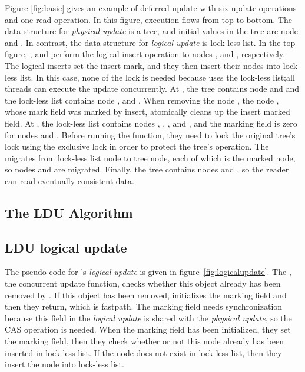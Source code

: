 Figure \ref{fig:basic} gives an example of deferred update with six update
operations and one read operation.
In this figure, execution flows from top to bottom.
The data structure for \emph{physical update} is a tree, and initial values in
the tree are node  and .
In contrast, the data structure for \emph{logical update} is lock-less list.
In the top figure, ,  and  perform the
logical insert operation to nodes ,  and ,
 respectively.
The logical inserts set the insert mark, and they then insert their
nodes into lock-less list.
In this case, none of the lock is needed because  uses the lock-less
list;all threads can execute the update concurrently.
At , the tree contains node 
and  and 
the lock-less list contains node ,  and .
When removing the node , the node , whose mark field was marked
by insert, atomically cleans up the insert marked field.
At , the lock-less list contains nodes
, , , and , and the marking field is zero for 
nodes  and .
Before running the  function, they need to lock the original
 tree's lock using the exclusive lock in order to protect the tree's
 operation.
The  migrates from lock-less list node to tree node, each of 
which is the marked node, so nodes  and  are migrated.
Finally, the tree contains nodes  and , so the reader can read
 eventually consistent data.


\subsection{The LDU Algorithm}



\subsection{LDU logical update}

The pseudo code for 's \emph{logical update} is given in
figure~\ref{fig:logicalupdate}.
The , the concurrent update function, checks whether this
object already has been removed by .
If this object has been removed,  initializes the marking
 field and then they return, which is fastpath.
The marking field needs synchronization because this field in the
\emph{logical update} is shared with the \emph{physical update}, so the CAS
 operation is needed.
When the marking field has been initialized, they set the
marking field, then they check whether or not this node already has been
 inserted in lock-less list.
If the node does not exist in lock-less list, then they insert the node into
lock-less list.



